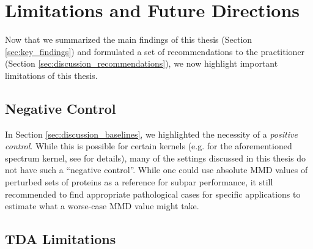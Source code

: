 \section{Limitations and Future Directions}\label{sec:discussion_limitations}

Now that we summarized the main findings of this thesis (Section
\ref{sec:key_findings}) and formulated a set of recommendations to the
practitioner (Section \ref{sec:discussion_recommendations}), we now highlight
important limitations of this thesis.


\subsection{Negative Control}

In Section \ref{sec:discussion_baselines}, we highlighted the necessity of a
\emph{positive control}. While this is possible for certain kernels (e.g. for
the aforementioned spectrum kernel, see \cite{kucera2021conditional} for
details), many of the settings discussed in this thesis do not have such a
``negative control''. While one could use absolute MMD values of perturbed sets
of proteins as a reference for subpar performance, it still recommended to find
appropriate pathological cases for specific applications to estimate what a worse-case
MMD value might take.



\subsection{TDA Limitations}

